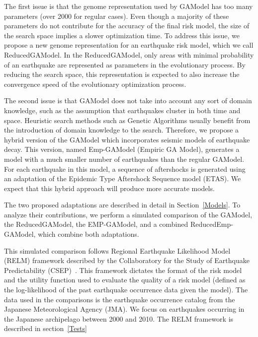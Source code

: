 The first issue is that the genome representation used by GAModel has
too many parameters (over 2000 for regular cases). Even though a
majority of these parameters do not contribute for the accuracy of the
final risk model, the size of the search space implies a slower
optimization time. To address this issue, we propose a new genome
representation for an earthquake risk model, which we call
ReducedGAModel. In the ReducedGAModel, only areas with minimal
probability of an earthquake are represented as parameters in the
evolutionary process. By reducing the search space, this
representation is expected to also increase the convergence speed of
the evolutionary optimization process.

The second issue is that GAModel does not take into account any sort
of domain knowledge, such as the assumption that earthquakes cluster
in both time and space. Heuristic search methods such as Genetic
Algorithms usually benefit from the introduction of domain knowledge
to the search. Therefore, we propose a hybrid version of the GAModel
which incorporates seismic models of earthquake decay. This version,
named Emp-GAModel (Empiric GA Model), generates a model with a much
smaller number of earthquakes than the regular GAModel. For each
earthquake in this model, a sequence of aftershocks is generated using
an adaptation of the Epidemic Type Aftershock Sequence model
(ETAS). We expect that this hybrid approach will produce more accurate
models.

The two proposed adaptations are described in detail in
Section~\ref{Models}. To analyze their contributions, we perform a
simulated comparison of the GAModel, the ReducedGAModel, the
EMP-GAModel, and a combined ReducedEmp-GAModel, which combine both 
adaptations. 

This simulated comparison follows Regional Earthquake Likelihood Model
(RELM) framework described by the Collaboratory for the Study of
Earthquake Predictability
(CSEP)~\cite{schorlermmer2007earthquake}. This framework dictates the
format of the risk model and the utility function used to evaluate the
quality of a risk model (defined as the log-likelihood of the past
earthquake occurrence data given the model). The data used in the
comparisons is the earthquake occurrence catalog from the Japanese
Meteorological Agency (JMA). We focus on earthquakes occurring in the
Japanese archipelago between 2000 and 2010. The RELM framework is
described in section~\ref{Tests}

